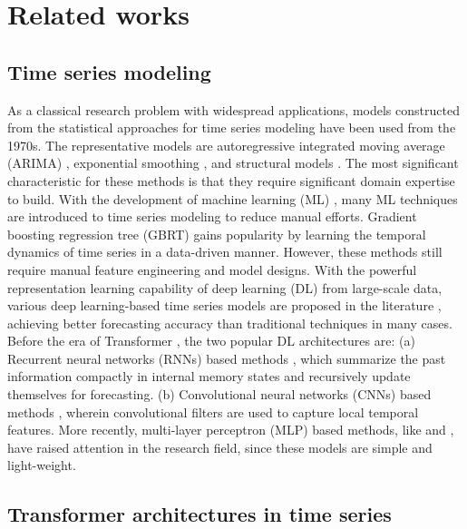 \section{Related works}
\label{sec:related_works}

\subsection{Time series modeling }

As a classical research problem with widespread applications, models constructed from the statistical approaches for time series modeling have been used from the 1970s. The representative models are autoregressive integrated moving average (ARIMA) \cite{box2015time}, exponential smoothing \cite{gardner1985exponential}, and structural models \cite{bollen1989structural}. The most significant characteristic for these methods is that they require significant domain expertise to build. With the development of machine learning (ML) \cite{biship2007pattern}, many ML techniques are introduced to time series modeling to reduce manual efforts. Gradient boosting regression tree (GBRT) \cite{drucker1994boosting,prokhorenkova2018catboost} gains popularity by learning the temporal dynamics of time series in a data-driven manner. However, these methods still require manual feature engineering and model designs. With the powerful representation learning capability of deep learning (DL) from large-scale data, various deep learning-based time series models are proposed in the literature \cite{lim2021time}, achieving better forecasting accuracy than traditional techniques in many cases. Before the era of Transformer \cite{vaswani2017attention}, the two popular DL architectures are: (a) Recurrent neural networks (RNNs) based methods \cite{Hochreiter1997LongSM}, which summarize the past information compactly in internal memory states and recursively update themselves for forecasting. (b) Convolutional neural networks (CNNs) based methods \cite{li2021survey}, wherein convolutional filters are used to capture local temporal features. More recently, multi-layer perceptron (MLP) based methods, like \cite{tang2025ts} and \cite{zeng2023transformers}, have raised attention in the research field, since these models are simple and light-weight.  




\subsection{Transformer architectures in time series}

